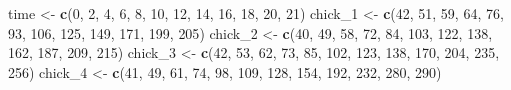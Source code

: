 \documentclass[]{book}
\newenvironment{Shaded}{\begin{snugshade}}{\end{snugshade}}
\newcommand{\DecValTok}[1]{\textcolor[rgb]{0.00,0.00,0.81}{#1}}
\newcommand{\KeywordTok}[1]{\textcolor[rgb]{0.13,0.29,0.53}{\textbf{#1}}}
\newcommand{\NormalTok}[1]{#1}
\newcommand{\StringTok}[1]{\textcolor[rgb]{0.31,0.60,0.02}{#1}}
\begin{document}
\begin{Shaded}
\begin{Highlighting}[]
\NormalTok{time <-}\StringTok{ }\KeywordTok{c}\NormalTok{(}\DecValTok{0}\NormalTok{, }\DecValTok{2}\NormalTok{, }\DecValTok{4}\NormalTok{, }\DecValTok{6}\NormalTok{, }\DecValTok{8}\NormalTok{, }\DecValTok{10}\NormalTok{, }\DecValTok{12}\NormalTok{, }\DecValTok{14}\NormalTok{, }\DecValTok{16}\NormalTok{, }\DecValTok{18}\NormalTok{, }\DecValTok{20}\NormalTok{, }\DecValTok{21}\NormalTok{)}
\NormalTok{chick_}\DecValTok{1}\NormalTok{ <-}\StringTok{ }\KeywordTok{c}\NormalTok{(}\DecValTok{42}\NormalTok{, }\DecValTok{51}\NormalTok{, }\DecValTok{59}\NormalTok{, }\DecValTok{64}\NormalTok{, }\DecValTok{76}\NormalTok{, }\DecValTok{93}\NormalTok{, }\DecValTok{106}\NormalTok{, }\DecValTok{125}\NormalTok{, }\DecValTok{149}\NormalTok{, }\DecValTok{171}\NormalTok{, }\DecValTok{199}\NormalTok{, }\DecValTok{205}\NormalTok{)}
\NormalTok{chick_}\DecValTok{2}\NormalTok{ <-}\StringTok{ }\KeywordTok{c}\NormalTok{(}\DecValTok{40}\NormalTok{, }\DecValTok{49}\NormalTok{, }\DecValTok{58}\NormalTok{, }\DecValTok{72}\NormalTok{, }\DecValTok{84}\NormalTok{, }\DecValTok{103}\NormalTok{, }\DecValTok{122}\NormalTok{, }\DecValTok{138}\NormalTok{, }\DecValTok{162}\NormalTok{, }\DecValTok{187}\NormalTok{, }\DecValTok{209}\NormalTok{, }\DecValTok{215}\NormalTok{)}
\NormalTok{chick_}\DecValTok{3}\NormalTok{ <-}\StringTok{ }\KeywordTok{c}\NormalTok{(}\DecValTok{42}\NormalTok{, }\DecValTok{53}\NormalTok{, }\DecValTok{62}\NormalTok{, }\DecValTok{73}\NormalTok{, }\DecValTok{85}\NormalTok{, }\DecValTok{102}\NormalTok{, }\DecValTok{123}\NormalTok{, }\DecValTok{138}\NormalTok{, }\DecValTok{170}\NormalTok{, }\DecValTok{204}\NormalTok{, }\DecValTok{235}\NormalTok{, }\DecValTok{256}\NormalTok{)}
\NormalTok{chick_}\DecValTok{4}\NormalTok{ <-}\StringTok{ }\KeywordTok{c}\NormalTok{(}\DecValTok{41}\NormalTok{, }\DecValTok{49}\NormalTok{, }\DecValTok{61}\NormalTok{, }\DecValTok{74}\NormalTok{, }\DecValTok{98}\NormalTok{, }\DecValTok{109}\NormalTok{, }\DecValTok{128}\NormalTok{, }\DecValTok{154}\NormalTok{, }\DecValTok{192}\NormalTok{, }\DecValTok{232}\NormalTok{, }\DecValTok{280}\NormalTok{, }\DecValTok{290}\NormalTok{)}


\end{Highlighting}
\end{Shaded}
\end{document}
